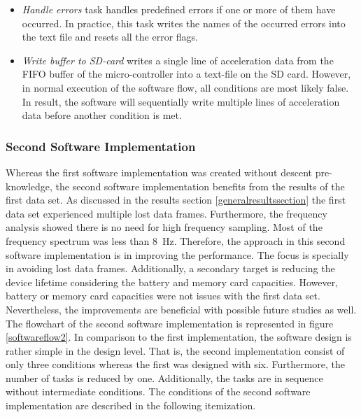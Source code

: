 \documentclass[english,12pt,a4paper,pdftex,elec,utf8]{aaltothesis}
\begin{document}
\begin{itemize}
\item \textit{Handle errors} task handles predefined errors if one or more of them have occurred. In practice, this task writes the names of the occurred errors into the text file and resets all the error flags.

\item \textit{Write buffer to SD-card} writes a single line of acceleration data from the FIFO buffer of the micro-controller into a text-file on the SD card. However, in normal execution of the software flow, all conditions are most likely false. In result, the software will sequentially write multiple lines of acceleration data before another condition is met.
\end{itemize}




\subsubsection*{Second Software Implementation}\label{seconddatasetconfigurations}


Whereas the first software implementation was created without descent pre-knowledge, the second software implementation benefits from the results of the first data set. As discussed in the results section \ref{generalresultssection} the first data set experienced multiple lost data frames. Furthermore, the frequency analysis showed there is no need for high frequency sampling. Most of the frequency spectrum was less than \SI{8}{\hertz}. Therefore, the approach in this second software implementation is in improving the performance. The focus is specially in avoiding lost data frames. Additionally, a secondary target is reducing the device lifetime considering the battery and memory card capacities. However, battery or memory card capacities were not issues with the first data set. Nevertheless, the improvements are beneficial with possible future studies as well. The flowchart of the second software implementation is represented in figure \ref{softwareflow2}. In comparison to the first implementation, the software design is rather simple in the design level. That is, the second implementation consist of only three conditions whereas the first was designed with six. Furthermore, the number of tasks is reduced by one. Additionally, the tasks are in sequence without intermediate conditions. The conditions of the second software implementation are described in the following itemization.
\end{document}
